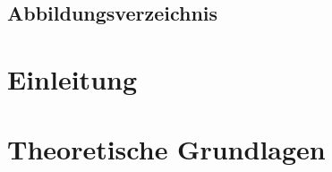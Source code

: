 \documentclass[a4paper,12pt]{report}
\begin{document}
	
	
	
	\cleardoublepage
	

	
	\newpage

	
	\newpage
	
	\tableofcontents
	
	
	\newpage
	
	\section*{Abbildungsverzeichnis}
	\renewcommand{\listfigurename}{} %
	\newpage

	
	\section*{\listtablename}
	\renewcommand{\listtablename}{} %
	\newpage

	
	\pagestyle{fancy}
	


	\chapter{Einleitung}
	
	\newpage
	
	\newpage
	
	\newpage
	

	\chapter{Theoretische Grundlagen}
	
	
	
    
\end{document}
